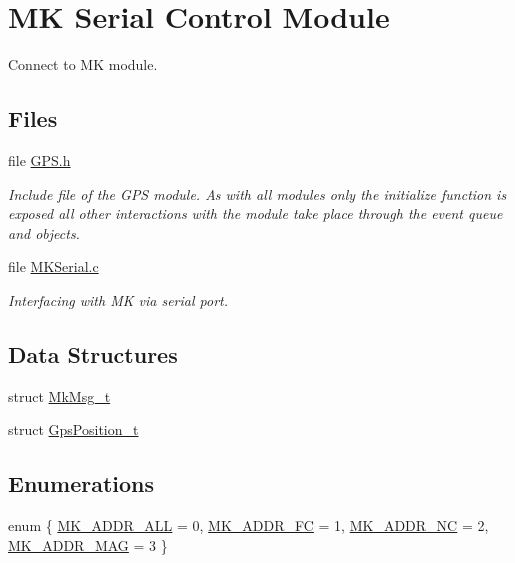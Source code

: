 \hypertarget{group___m_k_serial_module}{\section{M\-K Serial Control Module}
\label{group___m_k_serial_module}
}


Connect to M\-K module.  


\subsection*{Files}
\begin{DoxyCompactItemize}
\item 
file \hyperlink{_g_p_s_8h}{G\-P\-S.\-h}
\begin{DoxyCompactList}\small\item\em Include file of the G\-P\-S module. As with all modules only the initialize function is exposed all other interactions with the module take place through the event queue and objects. \end{DoxyCompactList}\item 
file \hyperlink{_m_k_serial_8c}{M\-K\-Serial.\-c}
\begin{DoxyCompactList}\small\item\em Interfacing with M\-K via serial port. \end{DoxyCompactList}\end{DoxyCompactItemize}
\subsection*{Data Structures}
\begin{DoxyCompactItemize}
\item 
struct \hyperlink{struct_mk_msg__t}{Mk\-Msg\-\_\-t}
\item 
struct \hyperlink{struct_gps_position__t}{Gps\-Position\-\_\-t}
\end{DoxyCompactItemize}
\subsection*{Enumerations}
\begin{DoxyCompactItemize}
\item 
enum \{ \hyperlink{group___m_k_serial_module_ggabc6126af1d45847bc59afa0aa3216b04abb75487675f1c2e9d3fd3a222cb0a510}{M\-K\-\_\-\-A\-D\-D\-R\-\_\-\-A\-L\-L} = 0, 
\hyperlink{group___m_k_serial_module_ggabc6126af1d45847bc59afa0aa3216b04a3ff02996312adb170f7a0e7de89fb481}{M\-K\-\_\-\-A\-D\-D\-R\-\_\-\-F\-C} = 1, 
\hyperlink{group___m_k_serial_module_ggabc6126af1d45847bc59afa0aa3216b04af6ed1ce06f1d0acbb04ad22b75da6222}{M\-K\-\_\-\-A\-D\-D\-R\-\_\-\-N\-C} = 2, 
\hyperlink{group___m_k_serial_module_ggabc6126af1d45847bc59afa0aa3216b04a37c0a7912015e43c5455235b0124520b}{M\-K\-\_\-\-A\-D\-D\-R\-\_\-\-M\-A\-G} = 3
 \}
\end{DoxyCompactItemize}
